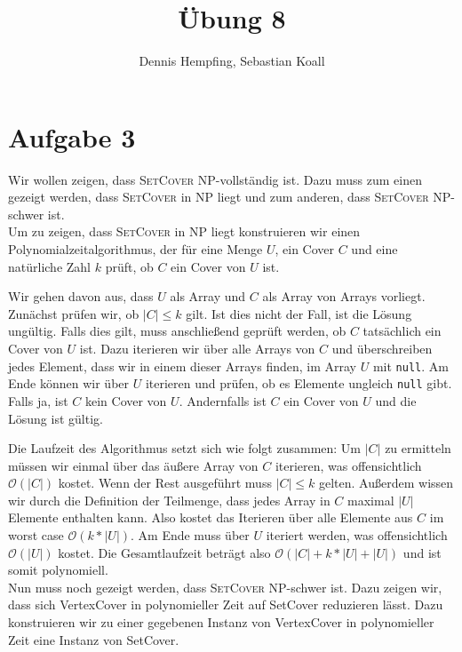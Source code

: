 \documentclass[12pt]{scrartcl}%
\theoremstyle{nonumberplain}
\newcommand{\bO}[1]{\mathcal O(#1)}
\newcommand{\code}[1]{\lstinline[basicstyle=\ttfamily\color{black}]{#1}}
\begin{document}
\author{Dennis Hempfing, Sebastian Koall}
\title{Übung 8}
\date{} 
\pagestyle{myheadings}

\maketitle %

\section*{Aufgabe 3}

Wir wollen zeigen, dass {\scshape SetCover} NP-vollständig ist. Dazu muss zum einen gezeigt werden, dass {\scshape SetCover} in NP liegt und zum anderen, dass {\scshape SetCover} NP-schwer ist.\\

Um zu zeigen, dass {\scshape SetCover} in NP liegt konstruieren wir einen Polynomialzeitalgorithmus, der für eine Menge $U$, ein Cover $C$ und eine natürliche Zahl $k$ prüft, ob $C$ ein Cover von $U$ ist.

Wir gehen davon aus, dass $U$ als Array und $C$ als Array von Arrays vorliegt. Zunächst prüfen wir, ob $|C| \le k$ gilt. Ist dies nicht der Fall, ist die Lösung ungültig. Falls dies gilt, muss anschließend geprüft werden, ob $C$ tatsächlich ein Cover von $U$ ist. Dazu iterieren wir über alle Arrays von $C$ und überschreiben jedes Element, dass wir in einem dieser Arrays finden, im Array $U$ mit \code{null}. Am Ende können wir über $U$ iterieren und prüfen, ob es Elemente ungleich \code{null} gibt. Falls ja, ist $C$ kein Cover von $U$. Andernfalls ist $C$ ein Cover von $U$ und die Lösung ist gültig.

Die Laufzeit des Algorithmus setzt sich wie folgt zusammen: Um $|C|$ zu ermitteln müssen wir einmal über das äußere Array von $C$ iterieren, was offensichtlich $\bO{|C|}$ kostet. Wenn der Rest ausgeführt muss $|C| \le k$ gelten. Außerdem wissen wir durch die Definition der Teilmenge, dass jedes Array in $C$ maximal $|U|$ Elemente enthalten kann. Also kostet das Iterieren über alle Elemente aus $C$ im worst case $\bO{k*|U|}$. Am Ende muss über $U$ iteriert werden, was offensichtlich $\bO{|U|}$ kostet. Die Gesamtlaufzeit beträgt also $\bO{|C| + k*|U| + |U|}$ und ist somit polynomiell.\\

Nun muss noch gezeigt werden, dass {\scshape SetCover} NP-schwer ist. Dazu zeigen wir, dass sich {\sc VertexCover} in polynomieller Zeit auf {\sc SetCover} reduzieren lässt. Dazu konstruieren wir zu einer gegebenen Instanz von {\sc VertexCover} in polynomieller Zeit eine Instanz von {\sc SetCover}.
\end{document}
